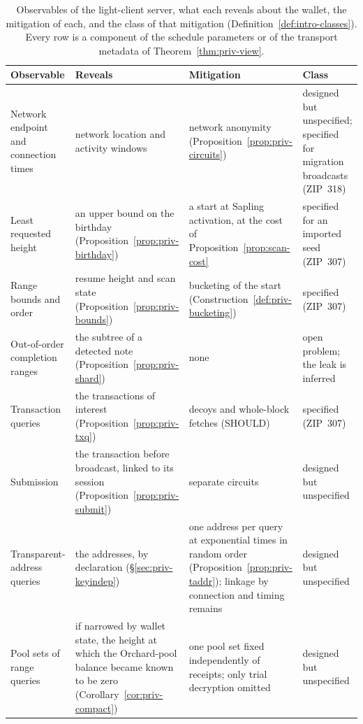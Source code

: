 \documentclass[11pt,a4paper]{article}
\theoremstyle{definition}
\begin{document}
\begin{table}[tp]
\centering\small
\setlength{\tabcolsep}{4pt}
\renewcommand{\arraystretch}{1.15}
\begin{tabular}{@{}p{2.6cm} p{3.3cm} p{3.95cm} p{3.25cm}@{}}
\toprule
Observable & Reveals & Mitigation & Class \\
\midrule
\raggedright Network endpoint and connection times
  & \raggedright network location and activity windows
  & \raggedright network anonymity
    (Proposition~\ref{prop:priv-circuits})
  & \raggedright designed but unspecified; specified for
    migration broadcasts (ZIP~318) \tabularnewline
\raggedright Least requested height
  & \raggedright an upper bound on the birthday
    (Proposition~\ref{prop:priv-birthday})
  & \raggedright a start at Sapling activation, at the cost of
    Proposition~\ref{prop:scan-cost}
  & \raggedright specified for an imported seed
    (ZIP~307) \tabularnewline
\raggedright Range bounds and order
  & \raggedright resume height and scan state
    (Proposition~\ref{prop:priv-bounds})
  & \raggedright bucketing of the start
    (Construction~\ref{def:priv-bucketing})
  & \raggedright specified (ZIP~307) \tabularnewline
\raggedright Out-of-order completion ranges
  & \raggedright the subtree of a detected note
    (Proposition~\ref{prop:priv-shard})
  & \raggedright none
  & \raggedright open problem; the leak is inferred \tabularnewline
\raggedright Transaction queries
  & \raggedright the transactions of interest
    (Proposition~\ref{prop:priv-txq})
  & \raggedright decoys and whole-block fetches (SHOULD)
  & \raggedright specified (ZIP~307) \tabularnewline
\raggedright Submission
  & \raggedright the transaction before broadcast, linked to its session
    (Proposition~\ref{prop:priv-submit})
  & \raggedright separate circuits
  & \raggedright designed but unspecified \tabularnewline
\raggedright Transparent-address queries
  & \raggedright the addresses, by declaration
    (\S\ref{sec:priv-keyindep})
  & \raggedright one address per query at exponential times in random
    order (Proposition~\ref{prop:priv-taddr}); linkage by connection and
    timing remains
  & \raggedright designed but unspecified \tabularnewline
\raggedright Pool sets of range queries
  & \raggedright if narrowed by wallet state, the height at which the
    Orchard-pool balance became known to be zero
    (Corollary~\ref{cor:priv-compact})
  & \raggedright one pool set fixed independently of receipts; only trial
    decryption omitted
  & \raggedright designed but unspecified \tabularnewline
\bottomrule
\end{tabular}
\caption{Observables of the light-client server, what each reveals about
the wallet, the mitigation of each, and the class of that mitigation
(Definition~\ref{def:intro-classes}). Every row is a component of the
schedule parameters or of the transport metadata of
Theorem~\ref{thm:priv-view}.}
\label{tab:priv-observables}
\end{table}
\end{document}
